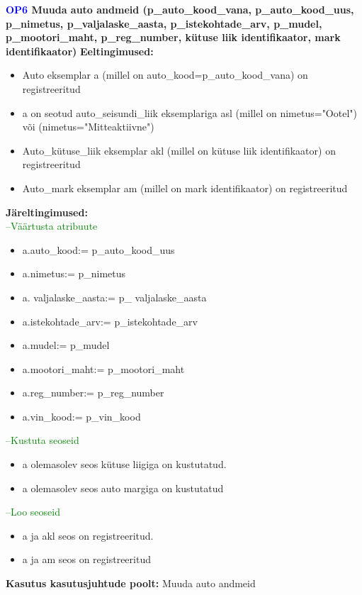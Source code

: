 \textbf{\textcolor{blue}{OP6} Muuda auto andmeid (p\_auto\_kood\_vana, p\_auto\_kood\_uus, p\_nimetus, p\_valjalaske\_aasta, p\_istekohtade\_arv, p\_mudel, p\_mootori\_maht, p\_reg\_number, kütuse liik identifikaator, mark identifikaator)}
\textbf{Eeltingimused:}
\begin{itemize}
	\item Auto eksemplar a (millel on auto\_kood=p\_auto\_kood\_vana) on registreeritud
	\item a on seotud auto\_seisundi\_liik eksemplariga asl (millel on nimetus="Ootel") või (nimetus="Mitteaktiivne")
	\item Auto\_kütuse\_liik eksemplar akl (millel on kütuse liik identifikaator) on registreeritud
	\item Auto\_mark eksemplar am (millel on mark identifikaator) on registreeritud
\end{itemize}
\textbf{Järeltingimused:} \\
\textcolor{green}{--Väärtusta atribuute}
\begin{itemize}
	\item a.auto\_kood:= p\_auto\_kood\_uus
	\item a.nimetus:= p\_nimetus
	\item a. valjalaske\_aasta:= p\_ valjalaske\_aasta
	\item a.istekohtade\_arv:= p\_istekohtade\_arv
	\item a.mudel:= p\_mudel
	\item a.mootori\_maht:= p\_mootori\_maht
	\item a.reg\_number:= p\_reg\_number
	\item a.vin\_kood:= p\_vin\_kood
\end{itemize}
\textcolor{green}{--Kustuta seoseid}
\begin{itemize}
	\item a olemasolev seos kütuse liigiga on kustutatud.
	\item a olemasolev seos auto margiga on kustutatud
\end{itemize}
\textcolor{green}{--Loo seoseid}
\begin{itemize}
	\item a ja akl seos on registreeritud.
	\item a ja am seos on registreeritud
\end{itemize}
\textbf{Kasutus kasutusjuhtude poolt:} Muuda auto andmeid \\ \hfill


